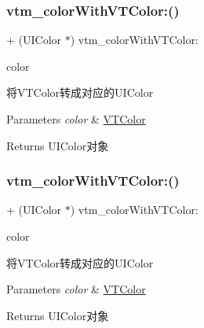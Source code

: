 \subsubsection{\texorpdfstring{vtm\+\_\+color\+With\+V\+T\+Color\+:()}{vtm\_colorWithVTColor:()}\hspace{0.1cm}{\footnotesize\ttfamily [2/3]}}
{\footnotesize\ttfamily + (U\+I\+Color $\ast$) vtm\+\_\+color\+With\+V\+T\+Color\+: \begin{DoxyParamCaption}\item[{(\mbox{\hyperlink{struct_v_t_color}{V\+T\+Color}})}]{color }\end{DoxyParamCaption}}

将\+V\+T\+Color转成对应的\+U\+I\+Color


\begin{DoxyParams}{Parameters}
{\em color} & \mbox{\hyperlink{struct_v_t_color}{V\+T\+Color}}\\
\hline
\end{DoxyParams}
\begin{DoxyReturn}{Returns}
U\+I\+Color对象 
\end{DoxyReturn}
\mbox{\label{category_u_i_color_07_magic_08_aafad3d97a89e9f3d60a4237c7e3e5b3b}} 
\subsubsection{\texorpdfstring{vtm\+\_\+color\+With\+V\+T\+Color\+:()}{vtm\_colorWithVTColor:()}\hspace{0.1cm}{\footnotesize\ttfamily [3/3]}}
{\footnotesize\ttfamily + (U\+I\+Color $\ast$) vtm\+\_\+color\+With\+V\+T\+Color\+: \begin{DoxyParamCaption}\item[{(\mbox{\hyperlink{struct_v_t_color}{V\+T\+Color}})}]{color }\end{DoxyParamCaption}}

将\+V\+T\+Color转成对应的\+U\+I\+Color


\begin{DoxyParams}{Parameters}
{\em color} & \mbox{\hyperlink{struct_v_t_color}{V\+T\+Color}}\\
\hline
\end{DoxyParams}
\begin{DoxyReturn}{Returns}
U\+I\+Color对象 
\end{DoxyReturn}
\mbox{\label{category_u_i_color_07_magic_08_a40f82f2b90825163129c4954ed33466c}} 
